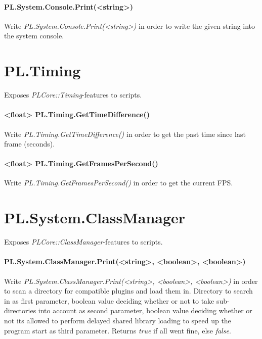 \paragraph{PL.System.Console.Print(<string>)}
Write \emph{PL.System.Console.Print(<string>)} in order to write the given string into the system console.




\section{PL.Timing}
Exposes \emph{PLCore::Timing}-features to scripts.

\paragraph{<float> PL.Timing.GetTimeDifference()}
Write \emph{PL.Timing.GetTimeDifference()} in order to get the past time since last frame (seconds).

\paragraph{<float> PL.Timing.GetFramesPerSecond()}
Write \emph{PL.Timing.GetFramesPerSecond()} in order to get the current \ac{FPS}.




\section{PL.System.ClassManager}
Exposes \emph{PLCore::ClassManager}-features to scripts.

\paragraph{PL.System.ClassManager.Print(<string>, <boolean>, <boolean>)}
Write \emph{PL.System.ClassManager.Print(<string>, <boolean>, <boolean>)} in order to scan a directory for compatible plugins and load them in. Directory to search in as first parameter, boolean value deciding whether or not to take sub-directories into account as second parameter, boolean value deciding whether or not its allowed to perform delayed shared library loading to speed up the program start as third parameter. Returns \emph{true} if all went fine, else \emph{false}.
